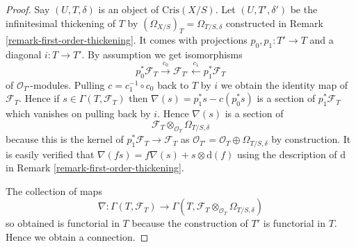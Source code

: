 \documentclass{stacks-project}
\theoremstyle{plain}
\theoremstyle{definition}
\theoremstyle{remark}
\numberwithin{equation}{subsection}
\begin{document}
\begin{proof}
Say $(U, T, \delta)$ is an object of $\text{Cris}(X/S)$.
Let $(U, T', \delta')$ be the infinitesimal thickening of $T$
by $(\Omega_{X/S})_T = \Omega_{T/S, \delta}$
constructed in Remark \ref{remark-first-order-thickening}.
It comes with projections $p_0, p_1 : T' \to T$
and a diagonal $i : T \to T'$. By assumption we get
isomorphisms
$$
p_0^*\mathcal{F}_T \xrightarrow{c_0}
\mathcal{F}_{T'} \xleftarrow{c_1}
p_1^*\mathcal{F}_T
$$
of $\mathcal{O}_{T'}$-modules. Pulling $c = c_1^{-1} \circ c_0$
back to $T$ by $i$ we obtain the identity map
of $\mathcal{F}_T$. Hence if $s \in \Gamma(T, \mathcal{F}_T)$
then $\nabla(s) = p_1^*s - c(p_0^*s)$ is a section of
$p_1^*\mathcal{F}_T$ which vanishes on pulling back by $i$. Hence
$\nabla(s)$ is a section of
$$
\mathcal{F}_T
\otimes_{\mathcal{O}_T}
\Omega_{T/S, \delta}
$$
because this is the kernel of $p_1^*\mathcal{F}_T \to \mathcal{F}_T$
as $\mathcal{O}_{T'} = \mathcal{O}_T \oplus \Omega_{T/S, \delta}$
by construction. It is easily verified that $\nabla(fs) =
f\nabla(s) + s \otimes \text{d}(f)$ using the description of
$\text{d}$ in Remark \ref{remark-first-order-thickening}.

\medskip\noindent
The collection of maps
$$
\nabla : \Gamma(T, \mathcal{F}_T) \to
\Gamma(T, \mathcal{F}_T \otimes_{\mathcal{O}_T} \Omega_{T/S, \delta})
$$
so obtained is functorial in $T$ because the construction of $T'$
is functorial in $T$. Hence we obtain a connection.


\end{proof}
\end{document}
